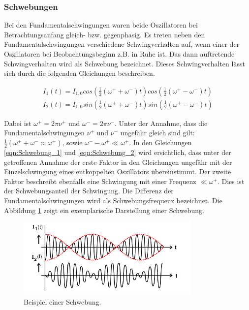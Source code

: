 \subsubsection{Schwebungen}

Bei den Fundamentalschwingungen waren beide Oszillatoren bei Betrachtungsanfang
gleich- bzw. gegenphasig. Es treten neben den Fundamentalschwingungen
verschiedene Schwingverhalten auf, wenn einer der Oszillatoren bei
Beobachtungsbeginn z.B. in Ruhe ist.
Das dann auftretende Schwingverhalten wird als Schwebung bezeichnet.
Dieses Schwingverhalten lässt sich durch die folgenden Gleichungen beschreiben.

\begin{align}
  \label{eqn:Schwebung_1}
  I_1(t) = I_{1,0}cos\left(\frac{1}{2}\left(\omega^+ + \omega^-\right)t\right)cos\left(\frac{1}{2}\left(\omega^+-\omega^-\right)t\right)\\
  \label{eqn:Schwebung_2}
  I_2(t) = I_{1,0}sin\left(\frac{1}{2}\left(\omega^+ + \omega^-\right)t\right)sin\left(\frac{1}{2}\left(\omega^+-\omega^-\right)t\right)
\end{align}

Dabei ist $\omega^+ = 2\pi\nu^+$ und $\omega^- = 2\pi\nu^-$.
Unter der Annahme, dass die Fundamentalschwingungen $\nu^+$ und $\nu^-$ ungefähr
gleich sind gilt:$\frac{1}{2}(\omega^++\omega^-\approx\omega^+)$, sowie
$\omega^- - \omega^+ \ll\omega^+$.
In den Gleichungen \eqref{eqn:Schwebung_1} und \eqref{eqn:Schwebung_2} wird
ersichtlich, dass unter der getroffenen Annahme der erste Faktor in den Gleichungen
ungefähr mit der Einzelschwingung eines entkoppelten Oszillators übereinstimmt.
Der zweite Faktor beschreibt ebenfalls eine Schwingung mit einer Frequenz
$\ll\omega^+$. Dies ist der Schwebungsanteil der Schwingung.
Die Differenz der Fundamentalschwingungen wird als Schwebungsfrequenz
bezeichnet. Die Abbildung \ref{fig:Schwebung} zeigt ein exemplarische Darstellung
einer Schwebung.

\begin{figure}
  \centering
  \includegraphics[width=9cm]{V355_Schwebung.png}
  \caption{Beispiel einer Schwebung.\cite{anleitung01}\protect}
  \label{fig:Schwebung}
\end{figure}


